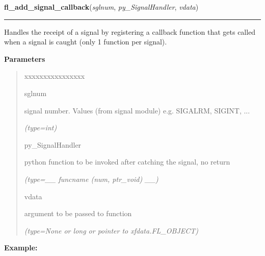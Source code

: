     \label{xformslib:flbasic:fl_add_signal_callback}

    \vspace{0.5ex}

\hspace{.8\funcindent}\begin{boxedminipage}{\funcwidth}

    \raggedright \textbf{fl\_add\_signal\_callback}(\textit{sglnum}, \textit{py\_SignalHandler}, \textit{vdata})

    \vspace{-1.5ex}

    \rule{\textwidth}{0.5\fboxrule}
\setlength{\parskip}{2ex}
    Handles the receipt of a signal by registering a callback function that
    gets called when a signal is caught (only 1 function per signal).

\setlength{\parskip}{1ex}
      \textbf{Parameters}
      \vspace{-1ex}

      \begin{quote}
        \begin{Ventry}{xxxxxxxxxxxxxxxx}

          \item[sglnum]

          signal number. Values (from signal module) e.g. SIGALRM, SIGINT, 
          ...

            {\it (type=int)}

          \item[py\_SignalHandler]

          python function to be invoked after catching the signal, no 
          return

            {\it (type=\_\_ funcname (num, ptr\_void) \_\_)}

          \item[vdata]

          argument to be passed to function

            {\it (type=None or long or pointer to xfdata.FL\_OBJECT)}

        \end{Ventry}

      \end{quote}

\textbf{Example:}
\begin{quote}
  \begin{itemize}


\end{itemize}
\end{quote}
\end{boxedminipage}
